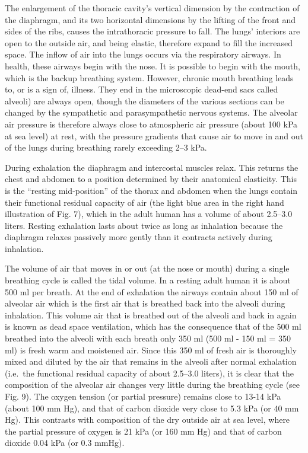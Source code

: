 The enlargement of the thoracic cavity's vertical dimension by the contraction of the diaphragm, and its two horizontal dimensions by the lifting of the front and sides of the ribs, causes the intrathoracic pressure to fall. The lungs' interiors are open to the outside air, and being elastic, therefore expand to fill the increased space. The inflow of air into the lungs occurs via the respiratory airways. In health, these airways begin with the nose. It is possible to begin with the mouth, which is the backup breathing system. However, chronic mouth breathing leads to, or is a sign of, illness. They end in the microscopic dead-end sacs called alveoli) are always open, though the diameters of the various sections can be changed by the sympathetic and parasympathetic nervous systems. The alveolar air pressure is therefore always close to atmospheric air pressure (about 100 kPa at sea level) at rest, with the pressure gradients that cause air to move in and out of the lungs during breathing rarely exceeding 2--3 kPa.

During exhalation the diaphragm and intercostal muscles relax. This returns the chest and abdomen to a position determined by their anatomical elasticity. This is the ``resting mid-position'' of the thorax and abdomen when the lungs contain their functional residual capacity of air (the light blue area in the right hand illustration of Fig. 7), which in the adult human has a volume of about 2.5--3.0 liters. Resting exhalation lasts about twice as long as inhalation because the diaphragm relaxes passively more gently than it contracts actively during inhalation.

The volume of air that moves in or out (at the nose or mouth) during a single breathing cycle is called the tidal volume. In a resting adult human it is about 500 ml per breath. At the end of exhalation the airways contain about 150 ml of alveolar air which is the first air that is breathed back into the alveoli during inhalation. This volume air that is breathed out of the alveoli and back in again is known as dead space ventilation, which has the consequence that of the 500 ml breathed into the alveoli with each breath only 350 ml (500 ml - 150 ml = 350 ml) is fresh warm and moistened air. Since this 350 ml of fresh air is thoroughly mixed and diluted by the air that remains in the alveoli after normal exhalation (i.e.~the functional residual capacity of about 2.5--3.0 liters), it is clear that the composition of the alveolar air changes very little during the breathing cycle (see Fig. 9). The oxygen tension (or partial pressure) remains close to 13-14 kPa (about 100 mm Hg), and that of carbon dioxide very close to 5.3 kPa (or 40 mm Hg). This contrasts with composition of the dry outside air at sea level, where the partial pressure of oxygen is 21 kPa (or 160 mm Hg) and that of carbon dioxide 0.04 kPa (or 0.3 mmHg).

